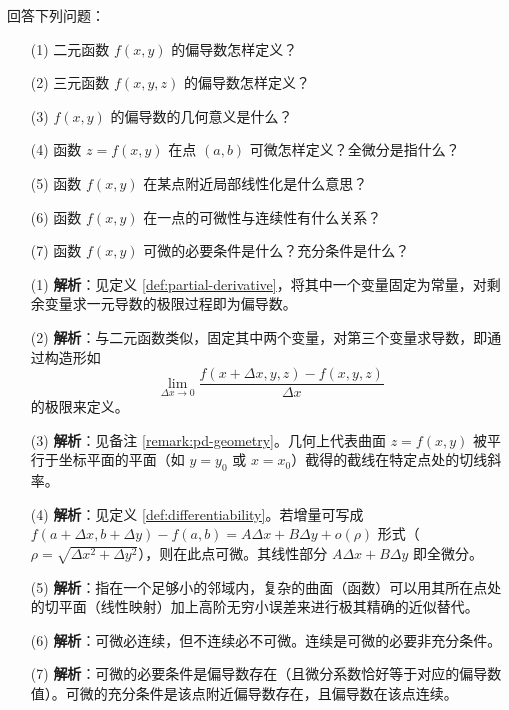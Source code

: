 \documentclass[lang=cn,11pt]{elegantbook}
\begin{document}
\begin{exercise}[基本概念问答]
回答下列问题：
\begin{enumerate}
  \item[(1)] 二元函数 $f(x,y)$ 的偏导数怎样定义？
  \item[(2)] 三元函数 $f(x,y,z)$ 的偏导数怎样定义？
  \item[(3)] $f(x,y)$ 的偏导数的几何意义是什么？
  \item[(4)] 函数 $z=f(x,y)$ 在点 $(a,b)$ 可微怎样定义？全微分是指什么？
  \item[(5)] 函数 $f(x,y)$ 在某点附近局部线性化是什么意思？
  \item[(6)] 函数 $f(x,y)$ 在一点的可微性与连续性有什么关系？
  \item[(7)] 函数 $f(x,y)$ 可微的必要条件是什么？充分条件是什么？
\end{enumerate}
\end{exercise}
\begin{solution}
\begin{enumerate}
  \item[(1)] \textbf{解析}：见定义 \ref{def:partial-derivative}，将其中一个变量固定为常量，对剩余变量求一元导数的极限过程即为偏导数。
  \item[(2)] \textbf{解析}：与二元函数类似，固定其中两个变量，对第三个变量求导数，即通过构造形如 \[\lim_{\Delta x \to 0} \frac{f(x+\Delta x,y,z) - f(x,y,z)}{\Delta x}\]的极限来定义。
  \item[(3)] \textbf{解析}：见备注 \ref{remark:pd-geometry}。几何上代表曲面 $z=f(x,y)$ 被平行于坐标平面的平面（如 $y=y_0$ 或 $x=x_0$）截得的截线在特定点处的切线斜率。
  \item[(4)] \textbf{解析}：见定义 \ref{def:differentiability}。若增量可写成 $f(a+\Delta x, b+\Delta y)-f(a,b) = A\Delta x + B\Delta y + o(\rho)$ 形式（$\rho=\sqrt{\Delta x^2+\Delta y^2}$），则在此点可微。其线性部分 $A\Delta x + B\Delta y$ 即全微分。
  \item[(5)] \textbf{解析}：指在一个足够小的邻域内，复杂的曲面（函数）可以用其所在点处的切平面（线性映射）加上高阶无穷小误差来进行极其精确的近似替代。
  \item[(6)] \textbf{解析}：可微必连续，但不连续必不可微。连续是可微的必要非充分条件。
  \item[(7)] \textbf{解析}：可微的必要条件是偏导数存在（且微分系数恰好等于对应的偏导数值）。可微的充分条件是该点附近偏导数存在，且偏导数在该点连续。
\end{enumerate}
\end{solution}
\end{document}
